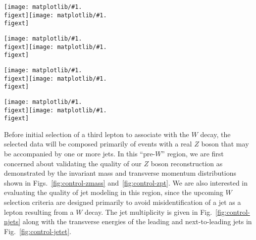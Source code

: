 {\newcommand{\myplot}[1]{\texttt{[image: matplotlib/\#1.\\figext]}}

\begin{figure*}
  \centering
  \myplot{hZMass_ValidZ}\hfill\myplot{hZMass_ValidWZCand}\\
  \caption[Invariant mass distribution of reconstructed $Z$ candidates for two selections]{Invariant mass distribution for reconstructed $Z$ candidates before a $W$ candidate is selected (left) and after $W$ selection and \MET requirements are applied (right).}
  \label{fig:control-zmass}
\end{figure*}

\begin{figure*}
  \centering
  \myplot{hZpt_ValidZ}\hfill\myplot{hZpt_ValidWZCand}\\
  \caption[Transverse momentum distribution of reconstructed $Z$ candidates for two selections]{Transverse momentum distribution of selected $Z$ candidates before a $W$ candidate is selected (left) and after $W$ selection and \MET requirements are applied (right).}
  \label{fig:control-zpt}
\end{figure*}

\begin{figure*}
  \centering
  \myplot{hNJets_ValidZ}\hfill\myplot{hNJets_ValidWZCand}\\
  \caption[Jet multiplicity distribution for two selections]{Jet multiplicity distribution before a $W$ candidate is selected (left) and after $W$ selection and \MET requirements are applied (right).}
  \label{fig:control-njets}
\end{figure*}

\begin{figure*}
  \centering
  \myplot{sreckoplots/jetPtFirst_COMB}\hfill\myplot{sreckoplots/jetPtSecond_COMB}\\
  \caption[Transverse energy distributions of leading and next-to-leading jets]{Transverse energy distributions of leading (left) and next-to-leading (right) jets before a $W$ candidate is selected.}
  \label{fig:control-jetet}
\end{figure*}
}

Before initial selection of a third lepton to associate with the $W$ decay, the selected data will be composed primarily of events with a real $Z$ boson that may be accompanied by one or more jets.  In this ``pre-$W$'' region, we are first concerned about validating the quality of our $Z$ boson reconstruction as demonstrated by the invariant mass and transverse momentum distributions shown in Figs.~\ref{fig:control-zmass} and~\ref{fig:control-zpt}.  We are also interested in evaluating the quality of jet modeling in this region, since the upcoming $W$ selection criteria are designed primarily to avoid misidentification of a jet as a lepton resulting from a $W$ decay.  The jet multiplicity is given in Fig.~\ref{fig:control-njets} along with the transverse energies of the leading and next-to-leading jets in Fig.~\ref{fig:control-jetet}.

